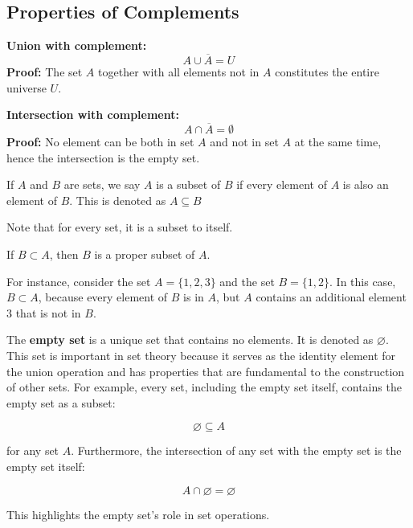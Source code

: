 \subsection*{Properties of Complements}
\textbf{Union with complement:}
\[
A \cup \overline{A} = U
\]
\textbf{Proof:} 
The set \( A \) together with all elements not in \( A \) constitutes the entire universe \( U \).

\textbf{Intersection with complement:}
\[
A \cap \overline{A} = \emptyset
\]
\textbf{Proof:} 
No element can be both in set \( A \) and not in set \( A \) at the same time, hence the intersection is the empty set.

\begin{definition}[Subset]
    If $A$ and $B$ are sets, we say $A$ is a subset of $B$ if every element of $A$ is also an element of $B$. This is denoted as \(A \subseteq B\)  
\end{definition}
\begin{remark}
    Note that for every set, it is a subset to itself.
\end{remark}
\begin{definition}
    If \( B \subset A \), then \( B \) is a proper subset of \( A \).
\end{definition}
For instance, consider the set \( A = \{1, 2, 3\} \) and the set \( B = \{1, 2\} \). In this case, \( B \subset A \), because every element of \( B \) is in \( A \), but \( A \) contains an additional element \( 3 \) that is not in \( B \).
\begin{definition}
    The \textbf{empty set} is a unique set that contains no elements. It is denoted as \( \varnothing \). This set is important in set theory because it serves as the identity element for the union operation and has properties that are fundamental to the construction of other sets. For example, every set, including the empty set itself, contains the empty set as a subset:

\[ \varnothing \subseteq A \]

for any set \( A \). Furthermore, the intersection of any set with the empty set is the empty set itself:

\[ A \cap \varnothing = \varnothing \]

This highlights the empty set's role in set operations.
\end{definition}

